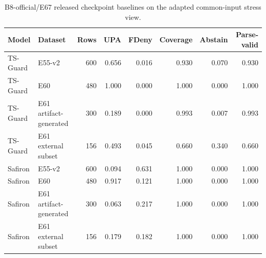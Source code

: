 \begin{table}[t]
\centering
\caption{B8-official/E67 released checkpoint baselines on the adapted common-input stress view.}
\label{tab:b8-official-checkpoints}
\begin{tabular}{llrrrrrr}
\toprule
Model & Dataset & Rows & UPA & FDeny & Coverage & Abstain & Parse-valid \\
\midrule
TS-Guard & E55-v2 & 600 & 0.656 & 0.016 & 0.930 & 0.070 & 0.930 \\
TS-Guard & E60 & 480 & 1.000 & 0.000 & 1.000 & 0.000 & 1.000 \\
TS-Guard & E61 artifact-generated & 300 & 0.189 & 0.000 & 0.993 & 0.007 & 0.993 \\
TS-Guard & E61 external subset & 156 & 0.493 & 0.045 & 0.660 & 0.340 & 0.660 \\
Safiron & E55-v2 & 600 & 0.094 & 0.631 & 1.000 & 0.000 & 1.000 \\
Safiron & E60 & 480 & 0.917 & 0.121 & 1.000 & 0.000 & 1.000 \\
Safiron & E61 artifact-generated & 300 & 0.063 & 0.217 & 1.000 & 0.000 & 1.000 \\
Safiron & E61 external subset & 156 & 0.179 & 0.182 & 1.000 & 0.000 & 1.000 \\
\bottomrule
\end{tabular}
\end{table}
